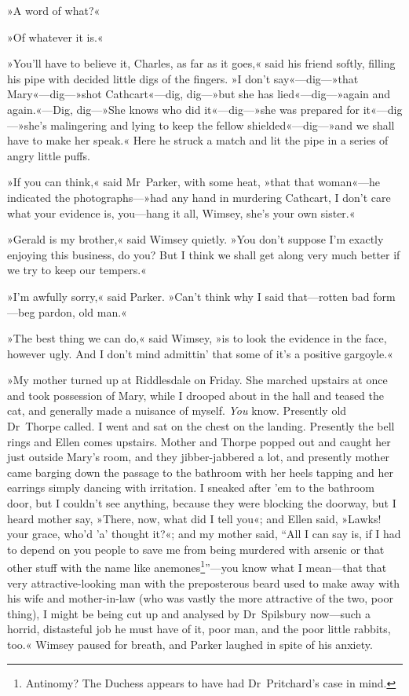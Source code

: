 »A word of what?«

»Of whatever it is.«

»You'll have to believe it, Charles, as far as it goes,« said his friend softly, filling his pipe with decided little digs of the fingers. »I don't say«—dig—»that Mary«—dig—»shot Cathcart«—dig, dig—»but she has lied«—dig—»again and again.«—Dig, dig—»She knows who did it«—dig—»she was prepared for it«—dig—»she's malingering and lying to keep the fellow shielded«—dig—»and we shall have to make her speak.« Here he struck a match and lit the pipe in a series of angry little puffs.

»If you can think,« said Mr~Parker, with some heat, »that that woman«—he indicated the photographs—»had any hand in murdering Cathcart, I don't care what your evidence is, you—hang it all, Wimsey, she's your own sister.«

»Gerald is my brother,« said Wimsey quietly. »You don't suppose I'm exactly enjoying this business, do you? But I think we shall get along very much better if we try to keep our tempers.«

»I'm awfully sorry,« said Parker. »Can't think why I said that—rotten bad form—beg pardon, old man.«

»The best thing we can do,« said Wimsey, »is to look the evidence in the face, however ugly. And I don't mind admittin' that some of it's a positive gargoyle.«

»My mother turned up at Riddlesdale on Friday. She marched upstairs at once and took possession of Mary, while I drooped about in the hall and teased the cat, and generally made a nuisance of myself. \textit{You} know. Presently old Dr~Thorpe called. I went and sat on the chest on the landing. Presently the bell rings and Ellen comes upstairs. Mother and Thorpe popped out and caught her just outside Mary's room, and they jibber-jabbered a lot, and presently mother came barging down the passage to the bathroom with her heels tapping and her earrings simply dancing with irritation. I sneaked after 'em to the bathroom door, but I couldn't see anything, because they were blocking the doorway, but I heard mother say, »There, now, what did I tell you«; and Ellen said, »Lawks! your grace, who'd 'a' thought it?«; and my mother said, \enquote{All I can say is, if I had to depend on you people to save me from being murdered with arsenic or that other stuff with the name like anemones\footnote{Antinomy? The Duchess appears to have had Dr~Pritchard's case in mind.}}—you know what I mean—that that very attractive-looking man with the preposterous beard used to make away with his wife and mother-in-law (who was vastly the more attractive of the two, poor thing), I might be being cut up and analysed by Dr~Spilsbury now—such a horrid, distasteful job he must have of it, poor man, and the poor little rabbits, too.« Wimsey paused for breath, and Parker laughed in spite of his anxiety.

